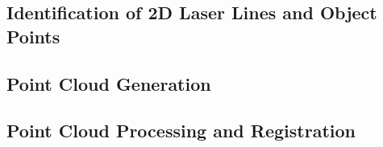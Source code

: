 \subsection{Identification of 2D Laser Lines and Object Points}
\label{subsection:search-laser}


\subsection{Point Cloud Generation}
\label{subsection:generate-pointcloud}


\subsection{Point Cloud Processing and Registration}
\label{subsection:registration}

